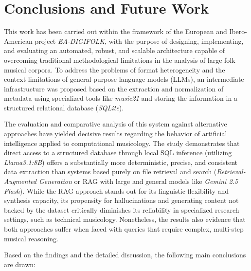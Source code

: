 \chapter{Conclusions and Future Work}
\label{cap:conclusions}

This work has been carried out within the framework of the European and Ibero-American project \textit{EA-DIGIFOLK}, with the purpose of designing, implementing, and evaluating an automated, robust, and scalable architecture capable of overcoming traditional methodological limitations in the analysis of large folk musical corpora. To address the problems of format heterogeneity and the context limitations of general-purpose language models (LLMs), an intermediate infrastructure was proposed based on the extraction and normalization of metadata using specialized tools like \textit{music21} and storing the information in a structured relational database (\textit{SQLite}).

The evaluation and comparative analysis of this system against alternative approaches have yielded decisive results regarding the behavior of artificial intelligence applied to computational musicology. The study demonstrates that direct access to a structured database through local SQL inference (utilizing \textit{Llama3.1:8B}) offers a substantially more deterministic, precise, and consistent data extraction than systems based purely on file retrieval and search (\textit{Retrieval-Augmented Generation} or RAG with large and general models like \textit{Gemini 2.5 Flash}). While the RAG approach stands out for its linguistic flexibility and synthesis capacity, its propensity for hallucinations and generating content not backed by the dataset critically diminishes its reliability in specialized research settings, such as technical musicology. Nonetheless, the results also evidence that both approaches suffer when faced with queries that require complex, multi-step musical reasoning.

Based on the findings and the detailed discussion, the following main conclusions are drawn:

